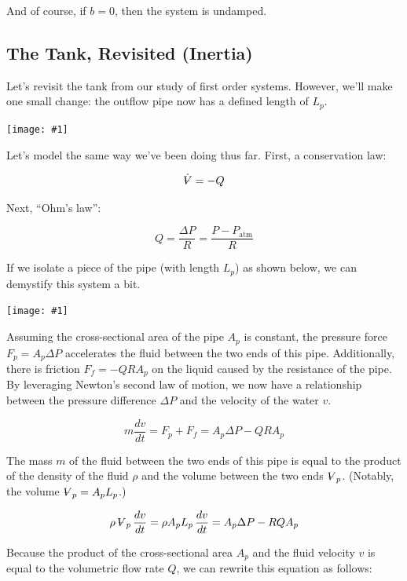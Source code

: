 \documentclass{article}
\newcommand{\Volume}{{\ooalign{\hfil$V$\hfil\cr\kern0.08em--\hfil\cr}}}
\newcommand{\bicture}[1]{
\begin{center}
    {\texttt{[image: \#1]}}
\end{center}}
\begin{document}
\begin{onehalfspacing}
\begin{flushleft}
\vspace{-0.35in}

And of course, if \(b=0\), then the system is undamped. 

\subsection{The Tank, Revisited (Inertia)}

Let's revisit the tank from our study of first order systems. However, we'll make one small change: the outflow pipe now has a defined length of \(L_p\). 

\bicture{6_inert}

Let's model the same way we've been doing thus far. First, a conservation law:

\vspace{-0.1in}
\[\dot{\Volume} = -Q\]

Next, ``Ohm's law'':

\vspace{-0.1in}
\[Q = \frac{\Delta P}{R} = \frac{P - P_\text{atm}}{R}\]

If we isolate a piece of the pipe (with length \(L_p\)) as shown below, we can demystify this system a bit.

\bicture{6_pipe}

Assuming the cross-sectional area of the pipe \(A_p\) is constant, the pressure force \(F_p = A_p \Delta P\) accelerates the fluid between the two ends of this pipe. Additionally, there is friction \(F_f = -QRA_p\) on the liquid caused by the resistance of the pipe. By leveraging Newton's second law of motion, we now have a relationship between the pressure difference \(\Delta P\) and the velocity of the water \(v\).

\vspace{-0.1in}
\[m \frac{dv}{dt} = F_p + F_f = A_p \Delta P - Q R A_p\]

The mass \(m\) of the fluid between the two ends of this pipe is equal to the product of the density of the fluid \(\rho\) and the volume between the two ends \(\Volume_p\). (Notably, the volume \(\Volume_p = A_p L_p\).)

\vspace{-0.1in}
\[\rho \, \Volume_p \, \frac{dv}{dt} = \rho A_p L_p \, \frac{dv}{dt} = A_p \Delta P - RQ A_p\]

Because the product of the cross-sectional area \(A_p\) and the fluid velocity \(v\) is equal to the volumetric flow rate \(Q\), we can rewrite this equation as follows:


\end{flushleft}
\end{onehalfspacing}
\end{document}
